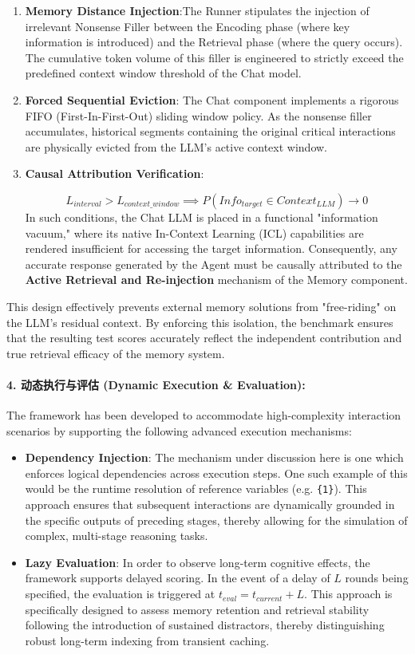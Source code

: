 \begin{enumerate}
\item \textbf{Memory Distance Injection}:The Runner stipulates the injection of irrelevant Nonsense Filler between the Encoding phase (where key information is introduced) and the Retrieval phase (where the query occurs). The cumulative token volume of this filler is engineered to strictly exceed the predefined context window threshold of the Chat model.
\item \textbf{Forced Sequential Eviction}: The Chat component implements a rigorous FIFO (First-In-First-Out) sliding window policy. As the nonsense filler accumulates, historical segments containing the original critical interactions are physically evicted from the LLM's active context window.
\item \textbf{Causal Attribution Verification}:

$$
    L_{interval} > L_{context\_window} \implies P(Info_{target} \in Context_{LLM}) \to 0
    $$
In such conditions, the Chat LLM is placed in a functional "information vacuum," where its native In-Context Learning (ICL) capabilities are rendered insufficient for accessing the target information. Consequently, any accurate response generated by the Agent must be causally attributed to the \textbf{Active Retrieval and Re-injection} mechanism of the Memory component.
\end{enumerate}

This design effectively prevents external memory solutions from "free-riding" on the LLM's residual context. By enforcing this isolation, the benchmark ensures that the resulting test scores accurately reflect the independent contribution and true retrieval efficacy of the memory system.

\paragraph{4. 动态执行与评估 (Dynamic Execution \& Evaluation):}
The framework has been developed to accommodate high-complexity interaction scenarios by supporting the following advanced execution mechanisms:

\begin{itemize}
\item \textbf{Dependency Injection}:  The mechanism under discussion here is one which enforces logical dependencies across execution steps. One such example of this would be the runtime resolution of reference variables (e.g. \texttt{\{1\}}). This approach ensures that subsequent interactions are dynamically grounded in the specific outputs of preceding stages, thereby allowing for the simulation of complex, multi-stage reasoning tasks.

\item \textbf{Lazy Evaluation}: In order to observe long-term cognitive effects, the framework supports delayed scoring. In the event of a delay of $L$ rounds being specified, the evaluation is triggered at $t_{eval} = t_{current} + L$. This approach is specifically designed to assess memory retention and retrieval stability following the introduction of sustained distractors, thereby distinguishing robust long-term indexing from transient caching.
\end{itemize}

